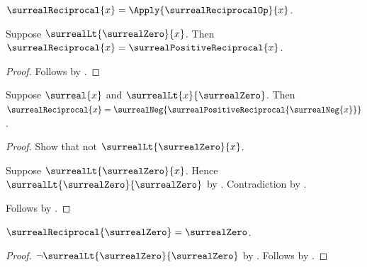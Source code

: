 \begin{definition}\label{surreal_reciprocal}
    $\surrealReciprocal{x}=\Apply{\surrealReciprocalOp}{x}$.
\end{definition}

\begin{proposition}\label{surreal_reciprocal_positive_equation}
    Suppose $\surrealLt{\surrealZero}{x}$.
    Then $\surrealReciprocal{x}=\surrealPositiveReciprocal{x}$.
\end{proposition}
\begin{proof}
    Follows by
        .
\end{proof}

\begin{proposition}\label{surreal_reciprocal_negative_equation}
    Suppose $\surreal{x}$ and $\surrealLt{x}{\surrealZero}$.
    Then $\surrealReciprocal{x}
        =\surrealNeg{\surrealPositiveReciprocal{\surrealNeg{x}}}$.
\end{proposition}
\begin{proof}
    Show that not $\surrealLt{\surrealZero}{x}$.
    \begin{subproof}
        Suppose $\surrealLt{\surrealZero}{x}$.
        Hence $\surrealLt{\surrealZero}{\surrealZero}$
            by .
        Contradiction by .
    \end{subproof}
    Follows by
        .
\end{proof}

\begin{proposition}\label{surreal_reciprocal_zero}
    $\surrealReciprocal{\surrealZero}=\surrealZero$.
\end{proposition}
\begin{proof}
    $\lnot\surrealLt{\surrealZero}{\surrealZero}$
        by .
    Follows by
        .
\end{proof}

